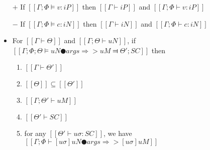 \begin{lemma} \label{lemma:typing-soundness}
    \hfill
    \begin{itemize}
        \item [$+$] If $[[Γ; Φ ⊨ v : iP]]$ then $[[Γ ⊢ iP]]$ and $[[Γ; Φ ⊢ v : iP]]$
        \item [$-$] If $[[Γ; Φ ⊨ c : iN]]$ then $[[Γ ⊢ iN]]$ and $[[Γ; Φ ⊢ c : iN]]$
        \item  For $[[Γ ⊢ Θ]]$ and $[[Γ; Θ ⊢ uN]]$, if $[[Γ; Φ; Θ ⊨ uN ● args ⇒> uM ⫤ Θ'; SC]]$ then
        \begin{enumerate}
            \item $[[Γ ⊢ Θ']]$
            \item $[[Θ]] \subseteq [[Θ']]$
            \item $[[Γ; Θ' ⊢ uM]]$
            \item $[[Θ' ⊢ SC]]$
            \item for any $[[Θ' ⊢ uσ : SC]]$, we have $[[ Γ ; Φ ⊢ [uσ]uN ● args ⇒> [uσ]uM ]]$
        \end{enumerate}
    \end{itemize}
\end{lemma}
